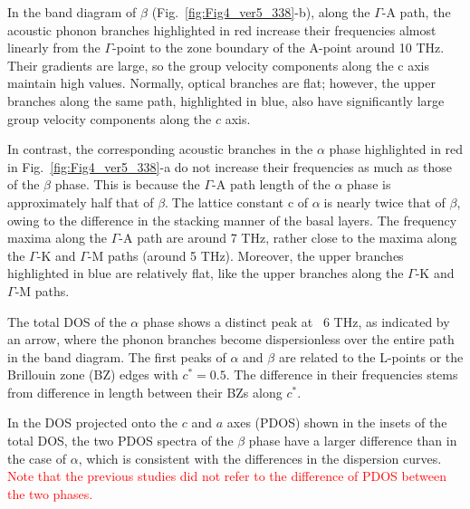 \documentclass[twocolumn,amsmath,amssymb,a4paper,prb,superscriptaddress,floatfix]{revtex4-1}
\begin{document}
In the band diagram of $\beta$ (Fig.~\ref{fig:Fig4_ver5_338}-b), along
the $\Gamma$-A path, the acoustic phonon branches highlighted in red
increase their frequencies almost linearly from the $\Gamma$-point to
the zone boundary of the A-point around 10 THz. Their gradients are
large, so the group velocity components along the c axis maintain high
values. Normally, optical branches are flat; however, the upper branches
along the same path, highlighted in blue, also have significantly large
group velocity components along the $c$ axis.

In contrast, the corresponding acoustic branches in the $\alpha$ phase
highlighted in red in Fig.~\ref{fig:Fig4_ver5_338}-a do not increase
their frequencies as much as those of the $\beta$ phase. This is because
the $\Gamma$-A path length of the $\alpha$ phase is approximately half
that of $\beta$.The lattice constant c of $\alpha$is nearly twice that
of $\beta$, owing to the difference in the stacking manner of the basal
layers. The frequency maxima along the $\Gamma$-A path are around 7 THz,
rather close to the maxima along the $\Gamma$-K and $\Gamma$-M paths
(around 5 THz). Moreover, the upper branches highlighted in blue are
relatively flat, like the upper branches along the $\Gamma$-K and
$\Gamma$-M paths.

The total DOS of the $\alpha$ phase shows a distinct peak at ~6 THz, as
indicated by an arrow, where the phonon branches become dispersionless
over the entire path in the band diagram. The first peaks of $\alpha$
and $\beta$ are related to the L-points or the Brillouin zone (BZ) edges
with $c^* = 0.5$. The difference in their frequencies stems from
difference in length between their BZs along $c^*$.

In the DOS projected onto the $c$ and $a$ axes (PDOS) shown in the
insets of the total DOS, the two PDOS spectra of the $\beta$ phase have
a larger difference than in the case of $\alpha$, which is consistent
with the differences in the dispersion curves.
%
\textcolor{red}{Note that the previous studies did not refer to the
difference of PDOS between the two phases.}
\end{document}
